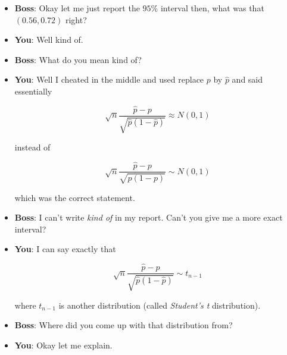 \documentclass{beamer}\usepackage[]{graphicx}\usepackage[]{color}
\begin{document}
\begin{frame}[fragile]

\begin{itemize}

\item \textbf{Boss}: Okay let me just report the $95 \%$ interval then, what was that $(0.56, 0.72)$ right?  \pause

\item \textbf{You}: Well kind of. \pause

\item \textbf{Boss}: What do you mean kind of? \pause

\item \textbf{You}: Well I cheated in the middle and used replace $p$ by $\hat{p}$ and said essentially

$$ \sqrt{n} \frac{\hat{p} - p}{\sqrt{\hat{p}(1-\hat{p})}} \approx N(0,1) $$

instead of

$$ \sqrt{n} \frac{\hat{p} - p}{\sqrt{p(1-p)}} \sim N(0,1) $$

which was the correct statement.

\item \textbf{Boss}: I can't write \textit{kind of} in my report. Can't you give me a more exact interval?

\end{itemize}

\end{frame}

\begin{frame}[fragile]

\begin{itemize}

\item \textbf{You}: I can say exactly that

$$ \sqrt{n} \frac{\hat{p} - p}{\sqrt{\hat{p}(1-\hat{p})}} \sim t_{n-1} $$

where $t_{n-1}$ is another distribution (called \textit{Student's t} distribution).

\item \textbf{Boss}: Where did you come up with that distribution from?

\item \textbf{You}: Okay let me explain.

\end{itemize}

\end{frame}
\end{document}
